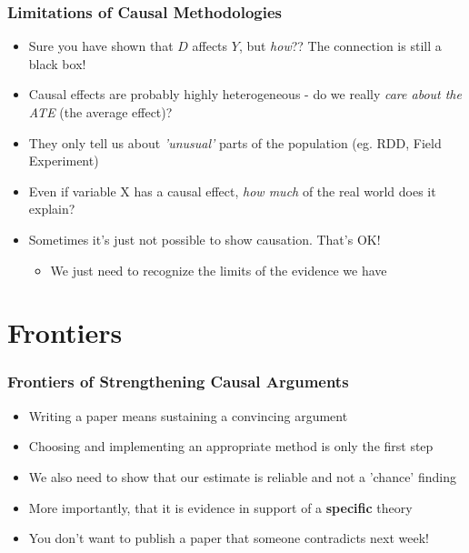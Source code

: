 \documentclass[xcolor=x11names,compress]{beamer}\usepackage[]{graphicx}\usepackage[]{color}
\renewcommand{\(}{\begin{columns}}
\renewcommand{\)}{\end{columns}}
\newcommand{\<}[1]{\begin{column}{#1}}
\renewcommand{\>}{\end{column}}
\begin{document}
\begin{frame}
\frametitle{Limitations of Causal Methodologies}
\begin{itemize}
\item Sure you have shown that $D$ affects $Y$, but \textit{how}?? The connection is still a black box!
\pause
\item Causal effects are probably highly heterogeneous - do we really \textit{care about the ATE} (the average effect)?
\pause
\item They only tell us about \textit{'unusual'} parts of the population (eg. RDD, Field Experiment)
\pause
\item Even if variable X has a causal effect, \textit{how much} of the real world does it explain?
\pause
\item Sometimes it's just not possible to show causation. That's OK!
\begin{itemize}
\item We just need to recognize the limits of the evidence we have
\end{itemize}
\end{itemize}
\end{frame}

\section{Frontiers}

\begin{frame}
\frametitle{Frontiers of Strengthening Causal Arguments}
\begin{itemize}
\item Writing a paper means sustaining a convincing argument
\pause
\item Choosing and implementing an appropriate method is only the first step
\pause
\item We also need to show that our estimate is reliable and not a 'chance' finding
\pause
\item More importantly, that it is evidence in support of a \textbf{specific} theory
\pause
\item You don't want to publish a paper that someone contradicts next week!
\end{itemize}
\end{frame}
\end{document}
